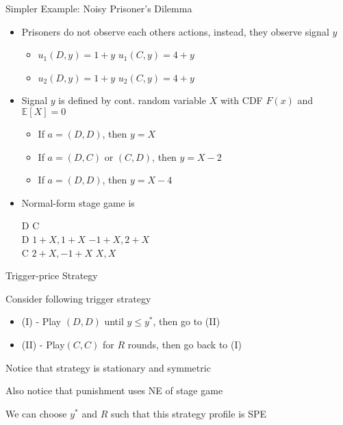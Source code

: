 \documentclass[11pt,aspectratio=169]{beamer}
\begin{document}
  
  \begin{frame}{Simpler Example: Noisy Prisoner's Dilemma}
   \begin{itemize}[<+->]
   \setlength{\itemsep}{0.5em}
    \item Prisoners do not observe each others actions, instead, they observe signal $y$
    \begin{itemize}
     \item $u_{1}(D, y) = 1 + y $   \hspace{1cm} $u_{1}(C, y) = 4 + y $ 
     \item $u_{2}(D, y) = 1 + y $   \hspace{1cm} $u_{2}(C, y) = 4 + y $ 
    \end{itemize}
    \item Signal $y$ is defined by cont. random variable $X$ with CDF $F(x)$ and $\mathbb{E}[X] = 0$
    \begin{itemize}
     \item If $a = (D, D)$, then $y = X$
     \item If $a = (D, C)$ or $(C, D)$, then $y = X - 2$
     \item If $a = (D, D)$, then $y = X - 4$ 
    \end{itemize}
    \item Normal-form stage game is
    \begin{center}\footnotesize
     \hspace{-6em}
     \begin{game}{2}{2}
      	\> D					\> C						\\
      D	\> $1 + X, 1 + X$	\> $ -1 + X, 2 + X$	\\
      C	\> $2 + X, -1 + X$	\> $ X, X$
     \end{game}
    \end{center}
   \end{itemize}
  \end{frame}

  
  \begin{frame} {Trigger-price Strategy}
   \begin{itemizes}[1.2em]
    \item Consider following trigger strategy
    \begin{itemize}
     \item (I) - Play $(D, D)$ until $y \le y^{*}$, then go to (II)
     \item (II) - Play$ (C, C)$ for $R$ rounds, then go back to (I)
    \end{itemize}
    \item Notice that strategy is stationary and symmetric
    \item Also notice that punishment uses \alert{NE of stage game}
    \item We can choose $y^{*}$ and $R$ such that this strategy profile is SPE
   \end{itemizes}
  \end{frame}
\end{document}
